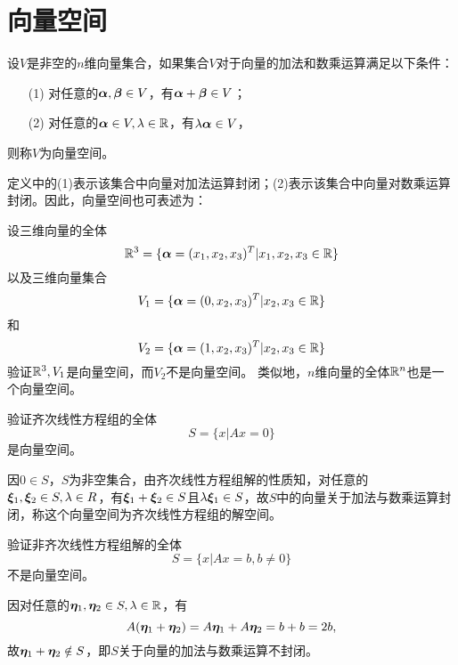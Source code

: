 \section{向量空间}

\begin{dingyi}[向量空间]
  设$V$是非空的$n$维向量集合，如果集合$V$对于向量的加法和数乘运算满足以下条件：
  \begin{itemize}
  \item[(1)] 对任意的$\boldsymbol{\alpha},\boldsymbol{\beta}\in V$，有$\boldsymbol{\alpha}+\boldsymbol{\beta}\in V$；
  \item[(2)] 对任意的$\boldsymbol{\alpha}\in V,\lambda \in \mathbb R$，有$\lambda\boldsymbol{\alpha}\in V$，
  \end{itemize}
  则称$V$为向量空间。
\end{dingyi}
定义中的(1)表示该集合中向量对加法运算封闭；(2)表示该集合中向量对数乘运算封闭。因此，向量空间也可表述为：

\begin{li}
  设三维向量的全体
  $$
  \mathbb R^3=\{\boldsymbol{\alpha}=(x_1,x_2,x_3)^T|x_1,x_2,x_3\in\mathbb R\}
  $$
  以及三维向量集合
  $$
  V_1=\{\boldsymbol{\alpha}=(0,x_2,x_3)^T|x_2,x_3\in\mathbb R\}
  $$
  和
  $$
  V_2=\{\boldsymbol{\alpha}=(1,x_2,x_3)^T|x_2,x_3\in\mathbb R\}
  $$
  验证$\mathbb R^3, V_1$是向量空间，而$V_2$不是向量空间。
  类似地，$n$维向量的全体$\mathbb R^n$也是一个向量空间。
\end{li}

\begin{li}
  验证齐次线性方程组的全体
  $$
  S=\{x|Ax=0\}
  $$
  是向量空间。
\end{li}
\begin{jie}
  因$0\in S$，$S$为非空集合，由齐次线性方程组解的性质知，对任意的$\boldsymbol{\xi}_1,\boldsymbol{\xi}_2\in S,\lambda \in R$，有$\boldsymbol{\xi}_1+\boldsymbol{\xi}_2\in S$且$\lambda \boldsymbol{\xi}_1\in S$，故$S$中的向量关于加法与数乘运算封闭，称这个向量空间为齐次线性方程组的解空间。 
\end{jie}

\begin{li}
  验证非齐次线性方程组解的全体
  $$
  S=\{x|Ax=b, b\ne 0\}
  $$
  不是向量空间。
\end{li}
\begin{jie}
  因对任意的$\boldsymbol{\eta}_1,\boldsymbol{\eta}_2\in S, \lambda\in \mathbb R$，有
  $$
  A(\boldsymbol{\eta}_1+\boldsymbol{\eta}_2)=A\boldsymbol{\eta}_1+A\boldsymbol{\eta}_2=b+b=2b,
  $$
  故$\boldsymbol{\eta}_1+\boldsymbol{\eta}_2\notin S$，即$S$关于向量的加法与数乘运算不封闭。
\end{jie}

